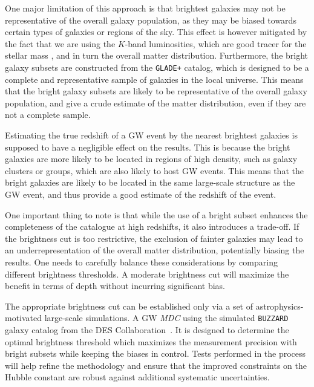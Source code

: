 One major limitation of this approach is that brightest galaxies may not be representative of the overall galaxy population, as they may be biased towards certain types of galaxies or regions of the sky. This effect is however mitigated by the fact that we are using the $K$-band luminosities, which are good tracer for the stellar mass \citep{strazzullo2006near,sureshkumar2021galaxy}, and in turn the overall matter distribution. Furthermore, the bright galaxy subsets are constructed from the \texttt{GLADE+} catalog, which is designed to be a complete and representative sample of galaxies in the local universe. This means that the bright galaxy subsets are likely to be representative of the overall galaxy population, and give a crude estimate of the matter distribution, even if they are not a complete sample.

Estimating the true redshift of a \ac{GW} event by the nearest brightest galaxies is supposed to have a negligible effect on the results. This is because the bright galaxies are more likely to be located in regions of high density, such as galaxy clusters or groups, which are also likely to host \ac{GW} events. This means that the bright galaxies are likely to be located in the same large-scale structure as the \ac{GW} event, and thus provide a good estimate of the redshift of the event. 

One important thing to note is that while the use of a bright subset enhances the completeness of the catalogue at high redshifts, it also introduces a trade-off. If the brightness cut is too restrictive, the exclusion of fainter galaxies may lead to an underrepresentation of the overall matter distribution, potentially biasing the results. One needs to carefully balance these considerations by comparing different brightness thresholds. A moderate brightness cut will maximize the benefit in terms of depth without incurring significant bias.

The appropriate brightness cut can be established only via a set of astrophysics-motivated large-scale simulations. A \ac{GW} \textit{\ac{MDC}} using the simulated \texttt{BUZZARD} galaxy catalog from the \ac{DES} Collaboration~\citep{DES:2019jmj,DES:2021bwg}. It is designed to determine the optimal brightness threshold which maximizes the measurement precision with bright subsets while keeping the biases in control. Tests performed in the process will help refine the methodology and ensure that the improved constraints on the Hubble constant are robust against additional systematic uncertainties.

